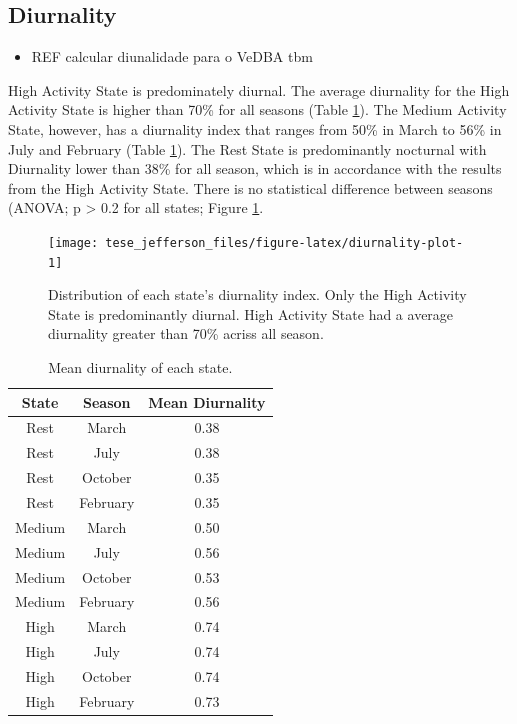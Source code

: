 \documentclass[english,msc,numbers,hidelinks]{coppe}
\providecommand{\tightlist}{%
  \setlength{\itemsep}{0pt}\setlength{\parskip}{0pt}}
\begin{document}
  \hypertarget{diurnality}{%
  \subsection{Diurnality}\label{diurnality}}
  \begin{itemize}
  \tightlist
  \item
    REF calcular diunalidade para o VeDBA tbm
  \end{itemize}
  High Activity State is predominately diurnal. The average diurnality for the High Activity State is higher than 70\% for all seasons (Table \ref{tab:table-mean-time-in-state}). The Medium Activity State, however, has a diurnality index that ranges from 50\% in March to 56\% in July and February (Table \ref{tab:table-mean-time-in-state}). The Rest State is predominantly nocturnal with Diurnality lower than 38\% for all season, which is in accordance with the results from the High Activity State. There is no statistical difference between seasons (ANOVA; p \textgreater{} 0.2 for all states; Figure \ref{fig:diurnality-plot}.
  \begin{figure}[H]

  {\centering \texttt{[image: tese\_jefferson\_files/figure-latex/diurnality-plot-1]} 

  }

  \caption{Distribution of each state's diurnality index. Only the High Activity State is predominantly diurnal. High Activity State had a average diurnality greater than 70\% acriss all season.}\label{fig:diurnality-plot}
  \end{figure}
  \begin{table}[!h]

  \caption{\label{tab:table-mean-time-in-state}Mean diurnality of each state.}
  \centering
  \begin{tabular}[t]{ccc}
  \toprule
  State & Season & Mean Diurnality\\
  \midrule
  Rest & March & 0.38\\
  Rest & July & 0.38\\
  Rest & October & 0.35\\
  Rest & February & 0.35\\
  Medium & March & 0.50\\
  \addlinespace
  Medium & July & 0.56\\
  Medium & October & 0.53\\
  Medium & February & 0.56\\
  High & March & 0.74\\
  High & July & 0.74\\
  \addlinespace
  High & October & 0.74\\
  High & February & 0.73\\
  \bottomrule
  \end{tabular}
  \end{table}
  \newpage
\end{document}
